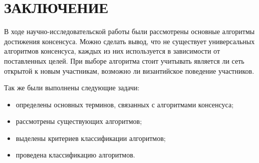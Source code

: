 \chapter*{ЗАКЛЮЧЕНИЕ}

    В ходе научно-исследовательской работы были рассмотрены основные алгоритмы достижения консенсуса. Можно сделать вывод, что не существует универсальных алгоритмов консенсуса, каждых из них используется в зависимости от поставленных целей. При выборе алгоритма стоит учитывать является ли сеть открытой к новым участникам, возможно ли византийское поведение участников.
    
    Так же были выполнены следующие задачи:
    
    \begin{itemize}
        \item определены основных терминов, связанных с алгоритмами консенсуса;
        \item рассмотрены существующих алгоритмов;
        \item выделены критериев классификации алгоритмов;
        \item проведена классификацию алгоритмов.
    \end{itemize}